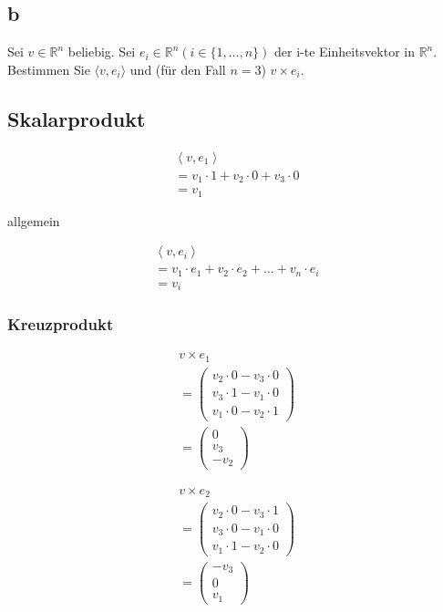 \subsection{b}
Sei $v \in \mathbb{R}^n$ beliebig. Sei $e_i \in \mathbb{R}^n (i \in \{1, \dots, n\})$ der i-te Einheitsvektor in $\mathbb{R}^n$. Bestimmen Sie $\langle v, e_i \rangle$ und (für den Fall $n = 3$) $v \times e_i$.

\subsection*{Skalarprodukt}

\begin{align*}
    \left\langle v, e_1 \right\rangle \\
    = v_1 \cdot 1 + v_2 \cdot 0 + v_3 \cdot 0\\
    = v_1
\end{align*}

allgemein

\begin{align*}
    \left\langle v, e_i \right\rangle \\
    = v_1 \cdot e_1 + v_2 \cdot e_2 + \dots + v_n \cdot e_i\\
    = v_i
\end{align*}

\subsubsection*{Kreuzprodukt}
\begin{align*}
    v \times e_1 \\
    = \begin{pmatrix}
        v_2 \cdot 0 - v_3 \cdot 0 \\
        v_3 \cdot 1 - v_1 \cdot 0 \\
        v_1 \cdot 0 - v_2 \cdot 1
    \end{pmatrix} \\
    = \begin{pmatrix}
        0 \\ v_3 \\ -v_2
    \end{pmatrix}
\end{align*}

\begin{align*}
    v \times e_2 \\
    = \begin{pmatrix}
        v_2 \cdot 0 - v_3 \cdot 1 \\
        v_3 \cdot 0 - v_1 \cdot 0 \\
        v_1 \cdot 1 - v_2 \cdot 0
    \end{pmatrix} \\
    = \begin{pmatrix}
        -v_3 \\ 0 \\ v_1
    \end{pmatrix}
\end{align*}

